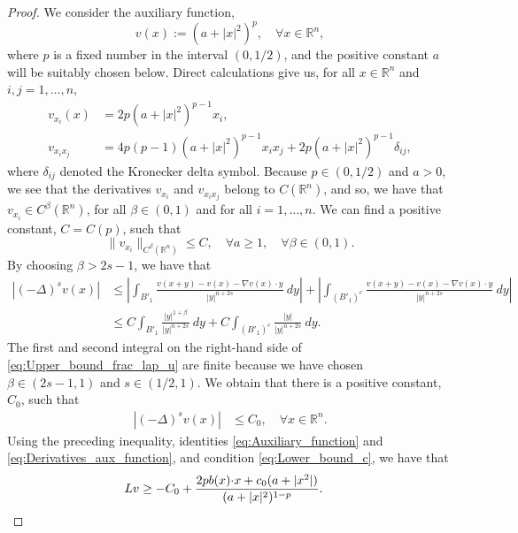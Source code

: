 \documentclass[11pt,reqno]{amsart}
\theoremstyle{definition}
\theoremstyle{remark}
\begin{document}
\begin{proof}
We consider the auxiliary function,
\begin{equation}
\label{eq:Auxiliary_function}
v(x):=(a+|x|^2)^p,\quad\forall x\in{\mathbb{R}}^n,
\end{equation}
where $p$ is a fixed number in the interval $(0,1/2)$, and the positive constant $a$ will be suitably chosen below. Direct calculations give us, for all $x\in{\mathbb{R}}^n$ and $i,j=1,\ldots,n$, 
\begin{equation}
\label{eq:Derivatives_aux_function}
\begin{aligned}
v_{x_i}(x) &= 2p(a+|x|^2)^{p-1}x_i,\\
v_{x_ix_j} &= 4p(p-1)(a+|x|^2)^{p-1}x_ix_j + 2p(a+|x|^2)^{p-1}\delta_{ij},
\end{aligned}
\end{equation}
where $\delta_{ij}$ denoted the Kronecker delta symbol. Because $p\in (0,1/2)$ and $a>0$, we see that the derivatives $v_{x_i}$ and $v_{x_ix_j}$ belong to $C({\mathbb{R}}^n)$, and so, we have that $v_{x_i}\in C^{\beta}({\mathbb{R}}^n)$, for all $\beta\in(0,1)$ and for all $i=1,\ldots,n$. We can find a positive constant, $C=C(p)$, such that
$$
\|v_{x_i}\|_{C^{\beta}({\mathbb{R}}^n)} \leq C,\quad\forall a\geq 1,\quad\forall \beta\in (0,1).
$$
By choosing $\beta>2s-1$, we have that
\begin{equation}
\label{eq:Upper_bound_frac_lap_u}
\begin{aligned}
|(-\Delta)^s v(x)| &\leq \left|\int_{B'_1}\frac{v(x+y)-v(x)-\nabla v(x)\cdot y}{|y|^{n+2s}} \ dy \right|
+ \left|\int_{(B'_1)^c}\frac{v(x+y)-v(x)-\nabla v(x)\cdot y}{|y|^{n+2s}} \ dy \right|\\
&\leq C\int_{B'_1}\frac{|y|^{1+\beta}}{|y|^{n+2s}} \ dy + C\int_{(B'_1)^c}\frac{|y|}{|y|^{n+2s}} \ dy.
\end{aligned}
\end{equation}
The first and second integral on the right-hand side of \eqref{eq:Upper_bound_frac_lap_u} are finite because we have chosen $\beta\in (2s-1,1)$ and $s\in (1/2,1)$. We obtain that there is a positive constant, $C_0$, such that
\begin{align*}
|(-\Delta)^s v(x)|&\leq C_0,\quad\forall x\in {\mathbb{R}}^n.
\end{align*}
Using the preceding inequality, identities \eqref{eq:Auxiliary_function} and \eqref{eq:Derivatives_aux_function}, and condition \eqref{eq:Lower_bound_c}, we have that
\begin{align*}
Lv &\geq -C_0 +\frac{2pb(x){\hbox{$\cdot$}} x+c_0(a+|x^2|)}{(a+|x|^2)^{1-p}}.

\end{align*}
\end{proof}
\end{document}
